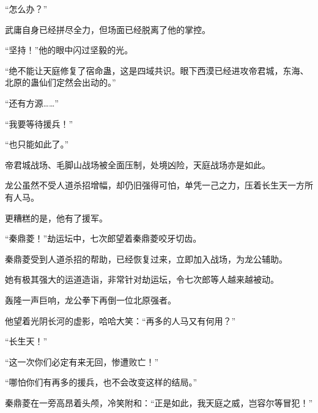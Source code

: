 \begin{this_body}
“怎么办？”

武庸自身已经拼尽全力，但场面已经脱离了他的掌控。

“坚持！”他的眼中闪过坚毅的光。

“绝不能让天庭修复了宿命蛊，这是四域共识。眼下西漠已经进攻帝君城，东海、北原的蛊仙们定然会出动的。”

“还有方源……”

“我要等待援兵！”

“也只能如此了。”

帝君城战场、毛脚山战场被全面压制，处境凶险，天庭战场亦是如此。

龙公虽然不受人道杀招增幅，却仍旧强得可怕，单凭一己之力，压着长生天一方所有人马。

更糟糕的是，他有了援军。

“秦鼎菱！”劫运坛中，七次郎望着秦鼎菱咬牙切齿。

秦鼎菱受到人道杀招的帮助，已经恢复过来，立即加入战场，为龙公辅助。

她有极其强大的运道造诣，非常针对劫运坛，令七次郎等人越来越被动。

轰隆一声巨响，龙公拳下再倒一位北原强者。

他望着光阴长河的虚影，哈哈大笑：“再多的人马又有何用？”

“长生天！”

“这一次你们必定有来无回，惨遭败亡！”

“哪怕你们有再多的援兵，也不会改变这样的结局。”

秦鼎菱在一旁高昂着头颅，冷笑附和：“正是如此，我天庭之威，岂容尔等冒犯！”

\end{this_body}

